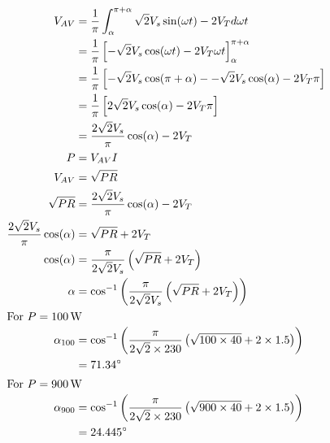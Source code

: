 \subsection{}

\begin{align*}
V_{AV} & = \frac{1}{\pi} \int_\alpha^{\pi + \alpha} \sqrt{2} V_s \sin(\omega t) - 2 V_T d \omega t \\
       & = \frac{1}{\pi} \left[ - \sqrt{2} V_s \cos(\omega t) - 2 V_T \omega t \right]_\alpha^{\pi + \alpha} \\
       & = \frac{1}{\pi} \left[ - \sqrt{2} V_s \cos(\pi+\alpha)-- \sqrt{2} V_s \cos(\alpha) - 2 V_T \pi \right] \\
       & = \frac{1}{\pi} \left[ 2\sqrt{2} V_s \cos(\alpha) - 2 V_T \pi \right] \\
       & = \frac{2\sqrt{2}V_s}{\pi} \cos(\alpha) - 2 V_T \\
P      & = V_{AV} I \\
V_{AV} & = \sqrt{P R} \\
\sqrt{P R} & = \frac{2\sqrt{2}V_s}{\pi} \cos(\alpha) - 2 V_T \\
\frac{2\sqrt{2}V_s}{\pi} \cos(\alpha)  & =  \sqrt{P R} + 2 V_T\\
\cos(\alpha)  & =  \frac{\pi}{2\sqrt{2}V_s}\left(\sqrt{P R} + 2 V_T \right)\\
\alpha   & =  \cos^{-1} \left(\frac{\pi}{2\sqrt{2}V_s}\left(\sqrt{P R} + 2 V_T \right)\right)\\
\intertext{For $P=\unit[100]{W}$}
\alpha_{100} & = \cos^{-1} \left(\frac{\pi}{2\sqrt{2} \times 230}\left(\sqrt{100 \times 40} + 2 \times 1.5 \right)\right)\\
                     & = 71.34^\circ \\
\intertext{For $P=\unit[900]{W}$}
\alpha_{900} & = 
   \cos^{-1} 
   \left(
      \frac{\pi}{2 \sqrt{2} \times 230}
      \left(
         \sqrt{900 \times 40} + 2 \times 1.5 
      \right)
   \right)\\
                     & = 24.445^\circ \\
\end{align*}
